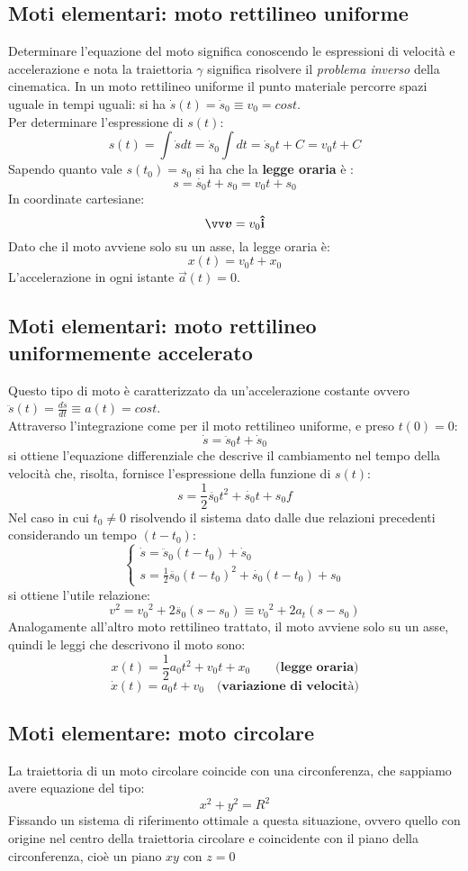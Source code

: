 \subsection*{Moti elementari: moto rettilineo uniforme}
Determinare  l'equazione del moto significa conoscendo le espressioni di  velocità e accelerazione e nota la traiettoria 
$\gamma $ significa risolvere il \emph{problema inverso} della cinematica.
In un moto rettilineo uniforme il punto materiale percorre spazi uguale in tempi uguali: si ha $\dot{s}(t) = \dot{s}_0
\equiv v_0 = cost$. \\
Per determinare l'espressione di $s(t)$:
\[
s(t) = \int \dot{s} dt = \dot{s}_0 \int dt = \dot{s}_0 t + C = v_0 t + C
\]
Sapendo quanto vale $s(t_0)= s_0$ si ha che la \textbf{legge oraria} è :
\[
   s = \dot{s_0}t + s_0 = v_0 t + s_0    
\]
In coordinate cartesiane:
\[
  \vec{v} = v_0 \v{i}     
\]
Dato che il moto avviene solo su un asse, la legge oraria è:
\[
  x(t) = v_0 t + x_0    
\]
L'accelerazione in ogni istante $\vec{a}(t) = 0$. 




\subsection*{Moti elementari: moto rettilineo uniformemente accelerato}

Questo tipo di moto è caratterizzato da un'accelerazione costante ovvero $\ddot{s}(t)
= \frac{d\dot{s}}{dt} \equiv a(t) = cost$. \\
Attraverso l'integrazione come per il moto rettilineo uniforme, e preso $t(0)= 0$:
\[
  \dot{s}= \ddot{s}_0t + \dot{s}_0    
\]
si ottiene l'equazione differenziale che descrive il cambiamento nel tempo della 
velocità che, risolta, fornisce l'espressione della funzione di $s(t)$:
\[
s = \frac{1}{2}\ddot{s_0}t^2 + \dot{s_0}t + s_0f    
\]
Nel caso in cui $t_0 \neq 0$ risolvendo il sistema dato dalle due relazioni precedenti considerando 
un tempo $(t-t_0)$:
\[
\begin{cases}

    \dot{s}= \ddot{s}_0(t-t_0) + \dot{s}_0    \\
    s = \frac{1}{2}\ddot{s_0}(t-t_0)^2 + \dot{s_0}(t-t_0) + s_0   

\end{cases}    
\]
si ottiene l'utile relazione:
\[
v^2 = {v_0}^2 + 2 \ddot{s_0}(s-s_0) \equiv {v_0}^2 + 2 a_t(s-s_0)   
\]
Analogamente all'altro moto rettilineo trattato, il moto avviene solo su un asse, quindi le leggi
che descrivono il moto sono:
\[
    x(t) = \frac{1}{2}a_0t^2 + v_0t + x_0   \qquad \textbf{(legge oraria)}
\]
\[
   \dot{x}(t) = a_0t + v_0 \quad \textbf{(variazione di velocità)}
\]


\subsection*{Moti elementare: moto circolare}
\label{cinem: circ-unif}
La traiettoria di un moto circolare coincide con una circonferenza, che sappiamo avere 
equazione del tipo:
\[
  x^2 + y^2 = R^2    
\] 
Fissando un sistema di riferimento ottimale a questa situazione, ovvero quello con origine
nel centro della traiettoria circolare e coincidente con il piano della circonferenza, cioè
un piano $xy$ con $z=0$ 
